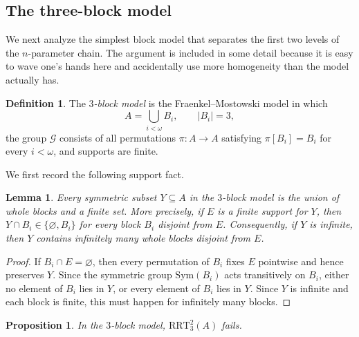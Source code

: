 \documentclass[10pt,a4paper]{amsart}
\newtheorem{proposition}[theorem]{Proposition}
\newtheorem{lemma}[theorem]{Lemma}
\theoremstyle{definition}
\newtheorem{definition}[theorem]{Definition}
\newcommand{\RRT}{\mathrm{RRT}}
\begin{document}
\subsection{The three-block model}

We next analyze the simplest block model that separates the first two levels of the \(n\)-parameter chain.  The argument is included in some detail because it is easy to wave one's hands here and accidentally use more homogeneity than the model actually has.

\begin{definition}\label{def:block-model}
The \emph{\(3\)-block model} is the Fraenkel--Mostowski model in which
\[
    A=\bigcup_{i<\omega}B_i,
    \qquad |B_i|=3,
\]
the group \(\mathcal G\) consists of all permutations \(\pi:A\to A\) satisfying \(\pi[B_i]=B_i\) for every \(i<\omega\), and supports are finite.
\end{definition}

We first record the following support fact.

\begin{lemma}\label{lem:block-support}
Every symmetric subset \(Y\subseteq A\) in the \(3\)-block model is the union of whole blocks and a finite set.  More precisely, if \(E\) is a finite support for \(Y\), then \(Y\cap B_i\in\{\varnothing,B_i\}\) for every block \(B_i\) disjoint from \(E\).  Consequently, if \(Y\) is infinite, then \(Y\) contains infinitely many whole blocks disjoint from \(E\).
\end{lemma}

\begin{proof}
If \(B_i\cap E=\varnothing\), then every permutation of \(B_i\) fixes \(E\) pointwise and hence preserves \(Y\).  Since the symmetric group \(\mathrm{Sym}(B_i)\) acts transitively on \(B_i\), either no element of \(B_i\) lies in \(Y\), or every element of \(B_i\) lies in \(Y\).  Since \(Y\) is infinite and each block is finite, this must happen for infinitely many blocks.
\end{proof}

\begin{proposition}\label{prop:block-rrt23-fails}
In the \(3\)-block model, \(\RRT^2_3(A)\) fails.
\end{proposition}
\end{document}
